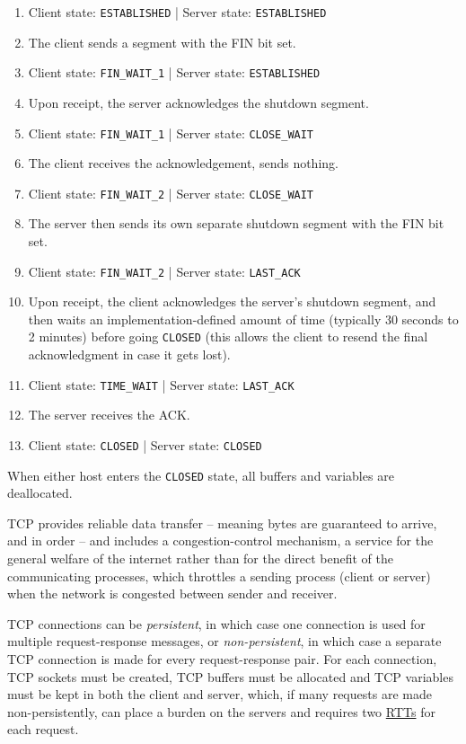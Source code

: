 \documentclass[8pt, table, xcdraw]{article}%
\begin{document}
\begin{enumerate}
    \item[\textbullet] Client state: \lstinline{ESTABLISHED} | Server state: \lstinline{ESTABLISHED}
    \item The client sends a segment with the FIN bit set.
    \item[\textbullet] Client state: \lstinline{FIN_WAIT_1} | Server state: \lstinline{ESTABLISHED}
    \item Upon receipt, the server acknowledges the shutdown segment.
    \item[\textbullet] Client state: \lstinline{FIN_WAIT_1} | Server state: \lstinline{CLOSE_WAIT}
    \item The client receives the acknowledgement, sends nothing.
    \item[\textbullet] Client state: \lstinline{FIN_WAIT_2} | Server state: \lstinline{CLOSE_WAIT}
    \item The server then sends its own separate shutdown segment with the FIN bit set.
    \item[\textbullet] Client state: \lstinline{FIN_WAIT_2} | Server state: \lstinline{LAST_ACK}
    \item Upon receipt, the client acknowledges the server's shutdown segment, and then waits an implementation-defined amount of time (typically 30 seconds to 2 minutes) before going \lstinline{CLOSED} (this allows the client to resend the final acknowledgment in case it gets lost).
    \item[\textbullet] Client state: \lstinline{TIME_WAIT} | Server state: \lstinline{LAST_ACK}
    \item The server receives the ACK.
    \item[\textbullet] Client state: \lstinline{CLOSED} | Server state: \lstinline{CLOSED}
\end{enumerate}

When either host enters the \lstinline{CLOSED} state, all buffers and variables are deallocated.

TCP provides reliable data transfer -- meaning bytes are guaranteed to arrive, and in order -- and includes a congestion-control mechanism, a service for the general welfare of the internet rather than for the direct benefit of the communicating processes, which throttles a sending process (client or server) when the network is congested between sender and receiver.

TCP connections can be \emph{persistent}, in which case one connection is used for multiple request-response messages, or \emph{non-persistent}, in which case a separate TCP connection is made for every request-response pair. For each connection, TCP sockets must be created, TCP buffers must be allocated and TCP variables must be kept in both the client and server, which, if many requests are made non-persistently, can place a burden on the servers and requires two \hyperref[ch:intro:delay]{RTTs} for each request.
\end{document}
